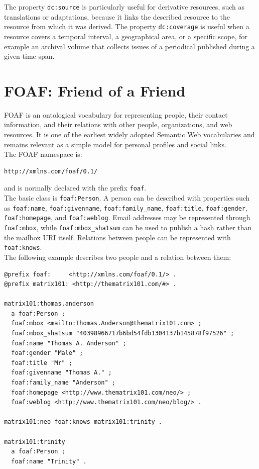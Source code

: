 \documentclass{scrbook}
\begin{document}
	The property \texttt{dc:source} is particularly useful for derivative resources, such as translations or adaptations, because it links the described resource to the resource from which it was derived. The property \texttt{dc:coverage} is useful when a resource covers a temporal interval, a geographical area, or a specific scope, for example an archival volume that collects issues of a periodical published during a given time span.
	
	\section{FOAF: Friend of a Friend}
	
	FOAF is an ontological vocabulary for representing people, their contact information, and their relations with other people, organizations, and web resources. It is one of the earliest widely adopted Semantic Web vocabularies and remains relevant as a simple model for personal profiles and social links.\\
	
	The FOAF namespace is:
	
	\begin{lstlisting}
http://xmlns.com/foaf/0.1/
	\end{lstlisting}
	
	and is normally declared with the prefix \texttt{foaf}.\\
	
	The basic class is \texttt{foaf:Person}. A person can be described with properties such as \texttt{foaf:name}, \texttt{foaf:givenname}, \texttt{foaf:family\_name}, \texttt{foaf:title}, \texttt{foaf:gender}, \texttt{foaf:homepage}, and \texttt{foaf:weblog}. Email addresses may be represented through \texttt{foaf:mbox}, while \texttt{foaf:mbox\_sha1sum} can be used to publish a hash rather than the mailbox URI itself. Relations between people can be represented with \texttt{foaf:knows}.\\
	
	The following example describes two people and a relation between them:
	
	\begin{lstlisting}
@prefix foaf:     <http://xmlns.com/foaf/0.1/> .
@prefix matrix101: <http://thematrix101.com/#> .
	
matrix101:thomas.anderson
  a foaf:Person ;
  foaf:mbox <mailto:Thomas.Anderson@thematrix101.com> ;
  foaf:mbox_sha1sum "40398966717b6bd54fdb1304137b145878f97526" ;
  foaf:name "Thomas A. Anderson" ;
  foaf:gender "Male" ;
  foaf:title "Mr" ;
  foaf:givenname "Thomas A." ;
  foaf:family_name "Anderson" ;
  foaf:homepage <http://www.thematrix101.com/neo/> ;
  foaf:weblog <http://www.thematrix101.com/neo/blog/> .
	
matrix101:neo foaf:knows matrix101:trinity .
	
matrix101:trinity
  a foaf:Person ;
  foaf:name "Trinity" .
	\end{lstlisting}
	
\end{document}
